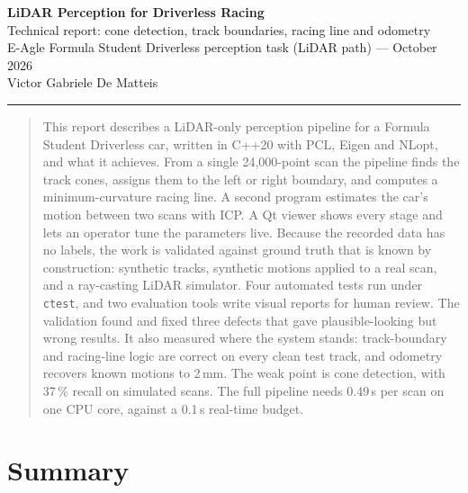 \documentclass[10pt,a4paper]{scrartcl}
\renewcommand{\emph}[1]{\textcolor{accent}{#1}}
\newcommand{\code}[1]{\texttt{#1}}
\newcommand{\RuleSection}[1]{%
    \section{#1}%
    \vspace{0.2em}{\color{accent!35}\hrule height 0.4pt}\vspace{0.3em}%
  }
\begin{document}

  \begin{center}
    {\Huge\bfseries\color{accent} LiDAR Perception for Driverless Racing}\\[0.25cm]
    {\large Technical report: cone detection, track boundaries, racing line and odometry}\\[0.2cm]
    {\small E-Agle Formula Student Driverless perception task (LiDAR path) --- October 2026}\\[0.15cm]
    {\small Victor Gabriele De Matteis}\\[0.2cm]
    {\color{accent!35}\hrule height 0.5pt}
  \end{center}

  \vspace{0.3em}

  \begin{abstract}
  \noindent
  This report describes a LiDAR-only perception pipeline for a Formula Student Driverless
  car, written in C++20 with PCL, Eigen and NLopt, and what it achieves. From a single
  24,000-point scan the pipeline finds the track cones, assigns them to the left or right
  boundary, and computes a minimum-curvature racing line. A second program estimates the
  car's motion between two scans with ICP. A Qt viewer shows every stage and lets an operator
  tune the parameters live. Because the recorded data has no labels, the work is validated
  against \emph{ground truth that is known by construction}: synthetic tracks, synthetic
  motions applied to a real scan, and a ray-casting LiDAR simulator. Four automated tests run
  under \code{ctest}, and two evaluation tools write visual reports for human review. The
  validation found and fixed three defects that gave plausible-looking but wrong results. It
  also measured where the system stands: track-boundary and racing-line logic are correct
  on every clean test track, and odometry recovers known motions to 2\,mm. The weak point is
  cone detection, with 37\,\% recall on simulated scans. The full pipeline needs 0.49\,s per
  scan on one CPU core, against a 0.1\,s real-time budget.
  \end{abstract}

  \RuleSection{Summary}
  \label{sec:summary}
\end{document}
